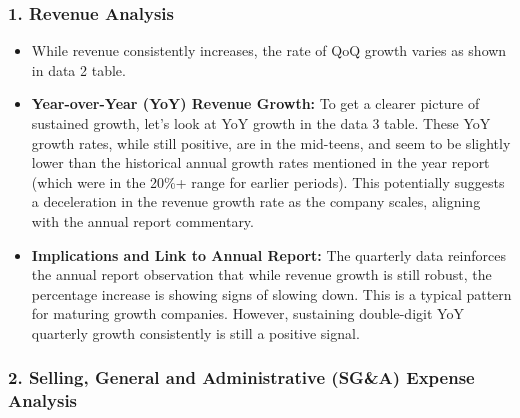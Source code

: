 \documentclass[
  10pt,
  a4paper,
]{article}
\providecommand{\tightlist}{%
  \setlength{\itemsep}{0pt}\setlength{\parskip}{0pt}}\usepackage{longtable,booktabs,array}
\begin{document}
\subsubsection{1. Revenue Analysis}\label{revenue-analysis}

\begin{itemize}
\tightlist
\item
  While revenue consistently increases, the rate of QoQ growth varies as
  shown in data 2 table.
\item
  \textbf{Year-over-Year (YoY) Revenue Growth:} To get a clearer picture
  of sustained growth, let's look at YoY growth in the data 3 table.
  These YoY growth rates, while still positive, are in the mid-teens,
  and seem to be slightly lower than the historical annual growth rates
  mentioned in the year report (which were in the 20\%+ range for
  earlier periods). This potentially suggests a deceleration in the
  revenue growth rate as the company scales, aligning with the annual
  report commentary.
\item
  \textbf{Implications and Link to Annual Report:} The quarterly data
  reinforces the annual report observation that while revenue growth is
  still robust, the percentage increase is showing signs of slowing
  down. This is a typical pattern for maturing growth companies.
  However, sustaining double-digit YoY quarterly growth consistently is
  still a positive signal.
\end{itemize}

\subsubsection{2. Selling, General and Administrative (SG\&A) Expense
Analysis}\label{selling-general-and-administrative-sga-expense-analysis}
\end{document}
